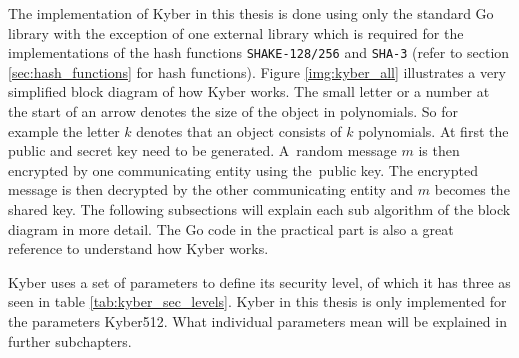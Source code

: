 The implementation of Kyber in this thesis is done using only the standard Go library with the exception of one external library \cite{00fV2cvg7Z6H2tS3} which is required for the implementations of the hash functions \texttt{SHAKE-128/256} and \texttt{SHA-3} (refer to section \ref{sec:hash_functions} for hash functions). Figure \ref{img:kyber_all} illustrates a very simplified block diagram of how Kyber works. The small letter or a number at the start of an arrow denotes the size of the object in polynomials. So for example the letter $k$ denotes that an object consists of $k$ polynomials. At first the public and secret key need to be generated. A~random message $m$ is then encrypted by one communicating entity using the~public key. The encrypted message is then decrypted by the other communicating entity and $m$ becomes the shared key. The following subsections will explain each sub algorithm of the block diagram in more detail. The Go code in the practical part is also a great reference to understand how Kyber works.


Kyber uses a set of parameters to define its security level, of which it has three as seen in table \ref{tab:kyber_sec_levels}. Kyber in this thesis is only implemented for the parameters Kyber512. What individual parameters mean will be explained in further subchapters.
